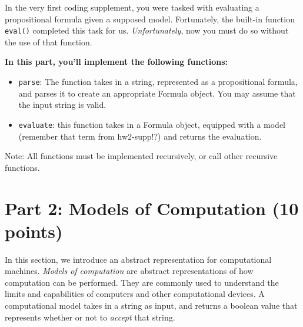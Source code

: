 \documentclass{article}
\begin{document}
\begin{tcolorbox}[enhanced,interior style={top color=Dandelion!20,bottom color=Dandelion!30}]
    In the very first coding supplement, you were tasked with evaluating a propositional formula given a supposed model. Fortunately, the built-in function \lstinline{eval()} completed this task for us. \textit{Unfortunately}, now you must do so without the use of that function.

    
    
    \textbf{In this part, you'll implement the following functions:}
    \begin{itemize}

        

        \item \lstinline{parse}: The function takes in a string, represented as a propositional formula, and parses it to create an appropriate Formula object. You may assume that the input string is valid.
        \item \lstinline{evaluate}: this function takes in a Formula object, equipped with a model (remember that term from hw2-supp!?) and returns the evaluation. 
    \end{itemize}

    Note: All functions must be implemented recursively, or call other recursive functions.
\end{tcolorbox}

\section*{Part 2: Models of Computation (10 points)}
    In this section, we introduce an abstract representation for computational machines. \textit{Models of computation} are abstract representations of how computation can be performed. They are commonly used to understand the limits and capabilities of computers and other computational devices. A computational model takes in a string as input, and returns a boolean value that represents whether or not to \textit{accept} that string.
\end{document}
